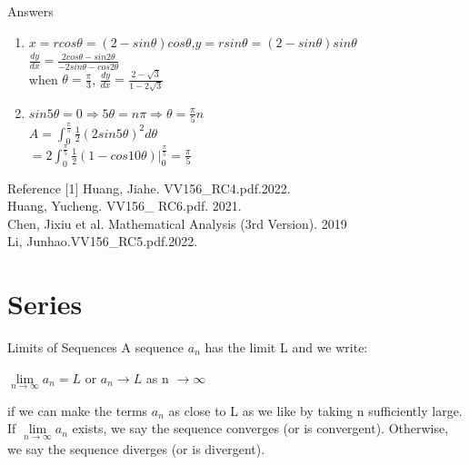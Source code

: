 \documentclass{beamer}
\begin{document}
\begin{frame}{Answers}
    \begin{enumerate}
        \item 
        $x=r cos\theta= (2-sin\theta)cos\theta$,$y=r sin\theta =(2-sin\theta) sin\theta$\\
        $\frac{dy}{dx}=\frac{2cos\theta-sin2\theta}{-2sin\theta-cos2\theta}$\\
        when $\theta = \frac{\pi}{3}$, $\frac{dy}{dx}=\frac{2-\sqrt{3}}{1-2\sqrt{3}}$
        \item
        $sin 5\theta= 0 \Rightarrow 5\theta=n\pi \Rightarrow \theta=\frac{\pi}{5} n$\\
        $A=\int_0^{\frac{\pi}{5}} \frac{1}{2}(2sin5\theta)^2 d\theta$\\
        $=2 \int_0^{\frac{\pi}{5}}\frac{1}{2}(1-cos10\theta)|_0^{\frac{\pi}{5}}=\frac{\pi}{5}$\\
    \end{enumerate}
\end{frame}

\begin{frame}{Reference}
[1] Huang, Jiahe. VV156\_RC4.pdf.2022.\\
[2] Huang, Yucheng. VV156\_ RC6.pdf. 2021.\\
[3] Chen, Jixiu et al. Mathematical Analysis (3rd Version). 2019\\
[4] Li, Junhao.VV156\_RC5.pdf.2022.

\end{frame}


\section{Series}

\begin{frame}{Limits of Sequences}
    A sequence {$a_n$} has the limit L and we write:
    \begin{center}
    $ \mathop{lim} \limits_{n \rightarrow \infty} a_n = L$ or $a_n \rightarrow L$ as n $\rightarrow \infty$ 
    \end{center}
    if we can make the terms $a_n$ as close to L as we like by taking n sufficiently large. If $\mathop{lim} \limits_{n \rightarrow \infty} a_n$ exists, we say the sequence converges (or is convergent). Otherwise, we say the sequence diverges (or is divergent).
\end{frame}
\end{document}
